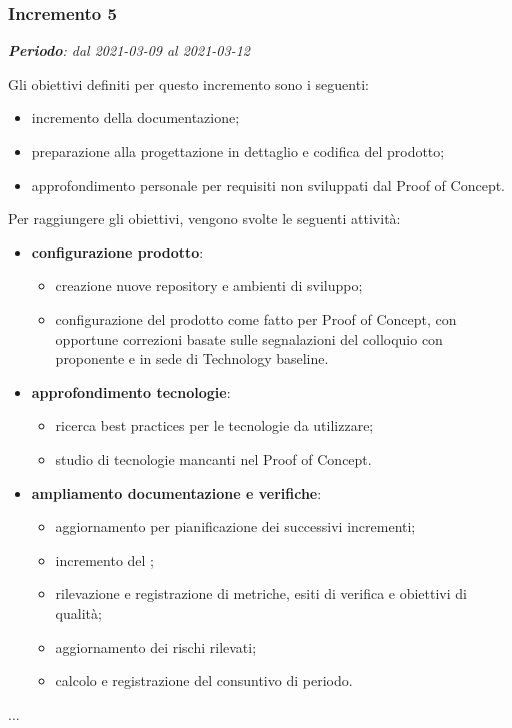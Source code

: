 \subsubsection{Incremento 5}
\textit{\textbf{Periodo}: dal 2021-03-09 al 2021-03-12}

Gli obiettivi definiti per questo incremento sono i seguenti:
\begin{itemize}
\item incremento della documentazione;
\item preparazione alla progettazione in dettaglio e codifica del prodotto;
\item approfondimento personale per requisiti non sviluppati dal Proof of Concept.
\end{itemize}

Per raggiungere gli obiettivi, vengono svolte le seguenti attività:
\begin{itemize}

\item \textbf{configurazione prodotto}:
\begin{itemize}
\item creazione nuove repository e ambienti di sviluppo;
\item configurazione del prodotto come fatto per Proof of Concept, con opportune correzioni basate sulle segnalazioni del colloquio con proponente e in sede di Technology baseline.
\end{itemize}

\item \textbf{approfondimento tecnologie}:
\begin{itemize}
\item ricerca best practices per le tecnologie da utilizzare;
\item studio di tecnologie mancanti nel Proof of Concept.
\end{itemize}

\item \textbf{ampliamento documentazione e verifiche}:
\begin{itemize}
\item aggiornamento  per pianificazione dei successivi incrementi;
\item incremento del ;
\item rilevazione e registrazione di metriche, esiti di verifica e obiettivi di qualità;
\item aggiornamento dei rischi rilevati;
\item calcolo e registrazione del consuntivo di periodo.
\end{itemize}

\end{itemize}
...

